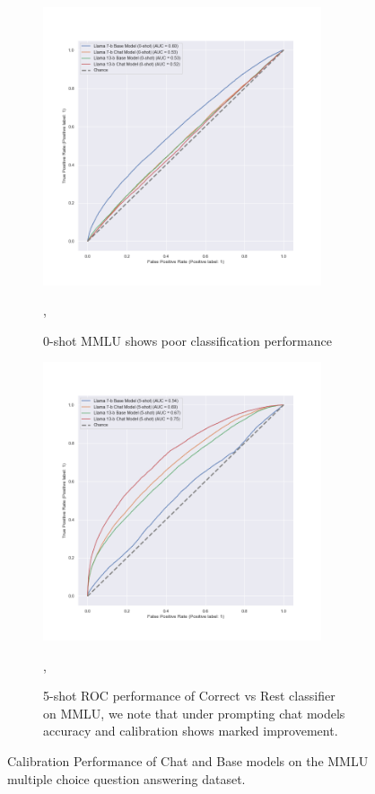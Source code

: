 \documentclass[11pt]{article}
\begin{document}
\begin{figure}
     \hfill
     \begin{subfigure}[b]{0.49\textwidth}
         \centering \includegraphics[width=0.9\textwidth]{figures/0-shot-MMLU-roc.png}
         \caption{0-shot MMLU shows poor classification performance},
         \label{fig:0-shot-MMLU}
    \end{subfigure} 
     \begin{subfigure}[b]{0.49\textwidth}
         \centering \includegraphics[width=0.9\textwidth]{figures/5-shot-MMLU-roc.png}
         \caption{5-shot ROC performance of Correct vs Rest classifier on 
         MMLU, we note that under prompting chat models accuracy and calibration shows marked improvement.},
         \label{fig:0-shot-MMLU}
    \end{subfigure} 
    
        \caption{Calibration Performance of Chat and Base models on the MMLU multiple choice question answering dataset.}
        \label{fig:three graphs}
\end{figure}
\end{document}

